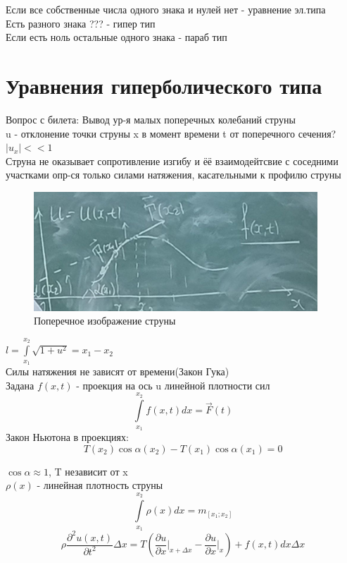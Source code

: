 \documentclass[a4paper]{article}
\begin{document}
Если все собственные числа одного знака и нулей нет - уравнение эл.типа \\
Есть разного знака ??? - гипер тип \\
Если есть ноль остальные одного знака - параб тип

\section*{\centering Уравнения гиперболического типа}
Вопрос с билета: Вывод ур-я малых поперечных колебаний струны \\
u - отклонение точки струны x в момент времени t от поперечного сечения?  \\
$ |u_x| << 1 $ \\
Струна не оказывает сопротивление изгибу и ёё взаимодейтсвие с соседними участками
опр-ся только силами натяжения, касательными к профилю струны\\
\begin{figure}
    \begin{center}
        \includegraphics[width=0.95\textwidth]{./figures/fig1-2.png}
    \end{center}
    \caption{Поперечное изображение струны}
\end{figure}


$ l = \int\limits_{x_1}^{x_2} \sqrt{1+u^2} = x_1 - x_2 $ \\
Силы натяжения не зависят от времени(Закон Гука) \\
Задана $ f(x,t) $ - проекция на ось u линейной плотности сил \\
\[
    \int\limits_{x_1}^{x_2} f(x,t) dx = \vec{F}(t)
\]
Закон Ньютона в проекциях:
\[
    T(x_2)\cos\alpha(x_2) - T(x_1)\cos\alpha(x_1) = 0
\]

$ \cos\alpha \approx 1 $, T независит от x\\

$\rho(x)$ - линейная плотность струны
\[
    \int\limits_{x_1}^{x_2} \rho(x) dx = m_{[x_1;x_2]}
\]
\[
    \rho \frac{\partial ^2 u(x,t)}{\partial t^2} \Delta x =
    T(\frac{\partial u}{\partial x}\big|_{x+\Delta x} - \frac{\partial u}
    {\partial x}\big|_{x}) + f(x,t)dx \Delta x
\]
\end{document}
